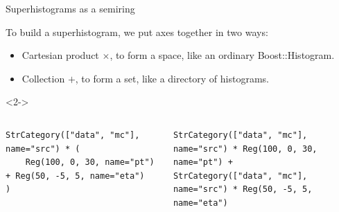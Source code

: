 \documentclass[aspectratio=169]{beamer}
\begin{document}
\begin{frame}[fragile]{Superhistograms as a semiring}
\large
\vspace{0.5 cm}

To build a superhistogram, we put axes together in two ways:

\vspace{0.25 cm}
\begin{itemize}
\item Cartesian product $\times$, to form a space, like an ordinary Boost::Histogram.
\item Collection $+$, to form a set, like a directory of histograms.
\end{itemize}

\vspace{0.5 cm}
\begin{uncoverenv}<2->
\begin{columns}

\small
\begin{verbatim}
StrCategory(["data", "mc"], name="src") * (
    Reg(100, 0, 30, name="pt") + Reg(50, -5, 5, name="eta")
)
\end{verbatim}

\vspace{-0.1 cm}

\begin{verbatim}
StrCategory(["data", "mc"], name="src") * Reg(100, 0, 30, name="pt") +
StrCategory(["data", "mc"], name="src") * Reg(50, -5, 5, name="eta")
\end{verbatim}

\vspace{0.1 cm}
\end{columns}
\end{uncoverenv}
\end{frame}
\end{document}
